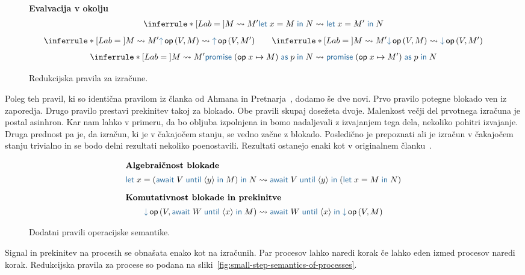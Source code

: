 \begin{figure}[H]
	\textbf{Evalvacija v okolju}
	\begin{align*}
	\coopinfer{}{
		M \reduces M'
	}{
		\tmlet{x}{M}{N} \reduces \tmlet{x}{M'}{N}
	}
	\end{align*}
\vspace{-4ex}
	\begin{align*}
	\coopinfer{}{
		M \reduces M'
	}{
		\tmopout{op}{V}{M} \reduces \tmopout{op}{V}{M'}
	}
	\qquad
	\coopinfer{}{
		M \reduces M'
	}{
		\tmopin{op}{V}{M} \reduces \tmopin{op}{V}{M'}
	}
	\end{align*}
\vspace{-4ex}
	\begin{align*}
	\coopinfer{}{
		M \reduces M'
	}{
		\tmwith{op}{x}{M}{p}{N} \reduces \tmwith{op}{x}{M'}{p}{N}
	}
	\end{align*}
	
	\caption{Redukcijska pravila za izračune.}
	\label{fig:small-step-semantics-of-computations}
\end{figure}


Poleg teh pravil, ki so identična pravilom iz članka od Ahmana in Pretnarja~\cite{aeff}, dodamo še dve novi.
Prvo pravilo potegne blokado ven iz zaporedja. Drugo pravilo prestavi prekinitev takoj za blokado. Obe pravili skupaj dosežeta dvoje. Malenkost večji del prvotnega izračuna je postal asinhron. Kar nam lahko v primeru, da bo obljuba izpolnjena in bomo nadaljevali z izvajanjem tega dela, nekoliko pohitri izvajanje. Druga prednost pa je, da izračun, ki je v čakajočem stanju, se vedno začne z blokado. Posledično je prepoznati ali je izračun v čakajočem stanju trivialno in se bodo delni rezultati nekoliko poenostavili. 
Rezultati ostanejo enaki kot v originalnem članku~\cite{aeff}.


\begin{figure}[H]
	\centering
	\small
	\begin{align*}
		\intertext{\textbf{Algebraičnost blokade}}
		\tmlet{x}{(\tmawait{V}{y}{M})}{N} & \reduces \tmawait{V}{y}{(\tmlet{x}{M}{N})}
		\\[1ex]
		\intertext{\textbf{Komutativnost blokade in prekinitve}}
		\tmopin{op}{V}{\tmawait{W}{x}{M}} &\reduces \tmawait{W}{x}{\tmopin{op}{V}{M}}
	\end{align*}
	
	\caption{Dodatni pravili operacijske semantike.}
	\label{fig:operacijska-semantika-poenostavitev}
\end{figure}

Signal in prekinitev na procesih se obnašata enako kot na izračunih. Par procesov lahko naredi korak če lahko eden izmed procesov naredi korak. Redukcijska pravila za procese so podana na sliki~\ref{fig:small-step-semantics-of-processes}.

